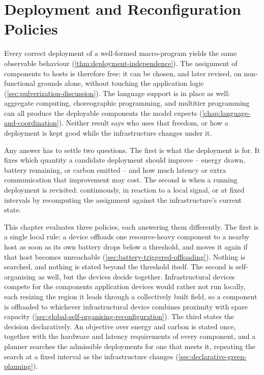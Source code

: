 \chapter{Deployment and Reconfiguration Policies}
\label{chap:deployment-and-reconfiguration}

Every correct deployment of a well-formed macro-program yields the same observable behaviour (\cref{thm:deployment-independence}).
%
The assignment of components to hosts is therefore free: it can be chosen, and later revised, on non-functional grounds alone, without touching the application logic (\cref{sec:pulverization-discussion}).
%
The language support is in place as well:
aggregate computing, choreographic programming, and multitier programming can all produce the deployable components the model expects (\cref{chap:language-and-coordination}).
%
Neither result says who uses that freedom, or how a deployment is kept good while the infrastructure changes under it.

Any answer has to settle two questions.
%
The first is what the deployment is for.
It fixes which quantity a candidate deployment should improve -- energy drawn, battery remaining, or carbon emitted -- and how much latency or extra communication that improvement may cost.
%
The second is when a running deployment is revisited:
continuously, in reaction to a local signal, or at fixed intervals by recomputing the assignment against the infrastructure's current state.

This chapter evaluates three policies, each answering them differently.
%
The first is a single local rule:
a device offloads one resource-heavy component to a nearby host as soon as its own battery drops below a threshold, and moves it again if that host becomes unreachable (\cref{sec:battery-triggered-offloading}).
Nothing is searched, and nothing is stated beyond the threshold itself.
%
The second is self-organising as well, but the devices decide together.
Infrastructural devices compete for the components application devices would rather not run locally, each resizing the region it leads through a collectively built field,
so a component is offloaded to whichever infrastructural device combines proximity with spare capacity (\cref{sec:global-self-organising-reconfiguration}).
%
The third states the decision declaratively.
An objective over energy and carbon is stated once, together with the hardware and latency requirements of every component,
and a planner searches the admissible deployments for one that meets it, repeating the search at a fixed interval as the infrastructure changes (\cref{sec:declarative-green-planning}).

